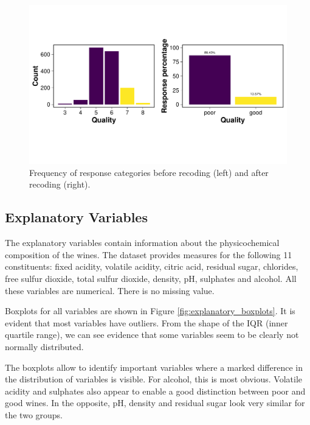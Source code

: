 \documentclass[11pt,]{article}
\begin{document}
\begin{figure}

{\centering \includegraphics[width=\linewidth]{./figures/response_boxplot-1} 

}

\caption{Frequency of response categories before recoding (left) and after recoding (right).}\label{fig:response_boxplot}
\end{figure}

\hypertarget{explanatory-variables}{%
\subsection{Explanatory Variables}\label{explanatory-variables}}

The explanatory variables contain information about the physicochemical
composition of the wines. The dataset provides measures for the
following 11 constituents: fixed acidity, volatile acidity, citric acid,
residual sugar, chlorides, free sulfur dioxide, total sulfur dioxide,
density, pH, sulphates and alcohol. All these variables are numerical.
There is no missing value.

Boxplots for all variables are shown in Figure
\ref{fig:explanatory_boxplots}. It is evident that most variables have
outliers. From the shape of the IQR (inner quartile range), we can see
evidence that some variables seem to be clearly not normally
distributed.

The boxplots allow to identify important variables where a marked
difference in the distribution of variables is visible. For alcohol,
this is most obvious. Volatile acidity and sulphates also appear to
enable a good distinction between poor and good wines. In the opposite,
pH, density and residual sugar look very similar for the two groups.
\end{document}
